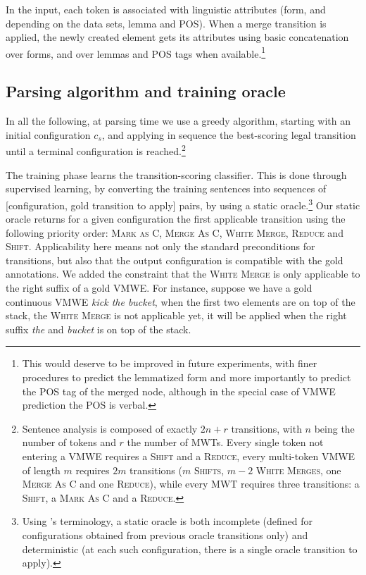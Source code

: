 \documentclass[output=paper,modfonts]{langscibook}
\begin{document}
In the input, each token is associated with linguistic attributes (form, and depending on the data sets, lemma and POS). When a merge transition is applied, the newly created element gets its attributes using basic concatenation over forms, and over lemmas and POS tags when available.\footnote{This would deserve to be improved in future experiments, with finer procedures to predict the lemmatized form and more importantly to predict the POS tag of the merged node, although in the special case of VMWE prediction the POS is verbal.}
\subsection{Parsing algorithm and training oracle}
\largerpage
In all the following, at parsing time we use a greedy algorithm, starting with an initial configuration $c_s$, and applying in sequence the best-scoring legal transition until a terminal configuration is reached.\footnote{Sentence analysis is composed of exactly $2n + r$ transitions, with $n$ being the number of tokens and $r$ the number of MWTs. Every single token not entering a VMWE requires a \textsc{Shift} and a \textsc{Reduce}, every multi-token VMWE of length $m$ requires $2m$ transitions ($m$ \textsc{Shifts}, $m-2$ \textsc{White Merges}, one \textsc{Merge As C} and one \textsc{Reduce}), while every MWT requires three transitions: a \textsc{Shift}, a \textsc{Mark As C} and a \textsc{Reduce}.}

The training phase learns the transition-scoring classifier. This is done through supervised learning, by converting the training sentences into sequences of [configuration, gold transition to apply] pairs, by using a static oracle.\footnote{Using \citep{goldberg2013training}'s terminology, a static oracle is both incomplete (defined for configurations obtained from previous oracle transitions only) and deterministic (at each such configuration, there is a single oracle transition to apply).} Our static oracle returns for a given configuration the first applicable transition using the following priority order: \textsc{Mark as C, Merge As C, White Merge, Reduce} and \textsc{Shift}. Applicability here means not only the standard preconditions for transitions, but also that the output configuration is compatible with the gold annotations. We added the constraint that the {\textsc{White Merge}} is only applicable to the right suffix of a gold VMWE. For instance, suppose we have a gold continuous VMWE \textit{kick the bucket}, when the first two elements are on top of the stack, the \textsc{White Merge} is not applicable yet, it will be applied when the right suffix \textit{the} and \textit{bucket} is on top of the stack.
\end{document}
